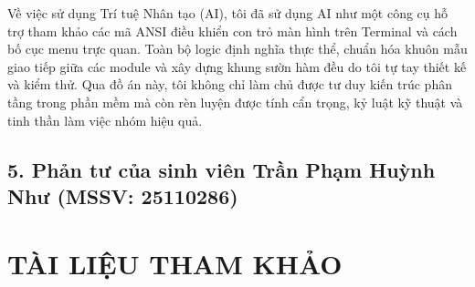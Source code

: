 \documentclass[14pt,a4paper]{extarticle}
\begin{document}
Về việc sử dụng Trí tuệ Nhân tạo (AI), tôi đã sử dụng AI như một công cụ hỗ trợ tham khảo các mã ANSI điều khiển con trỏ màn hình trên Terminal và cách bố cục menu trực quan. Toàn bộ logic định nghĩa thực thể, chuẩn hóa khuôn mẫu giao tiếp giữa các module và xây dựng khung sườn hàm đều do tôi tự tay thiết kế và kiểm thử. Qua đồ án này, tôi không chỉ làm chủ được tư duy kiến trúc phân tầng trong phần mềm mà còn rèn luyện được tính cẩn trọng, kỷ luật kỹ thuật và tinh thần làm việc nhóm hiệu quả.

\subsection*{5. Phản tư của sinh viên Trần Phạm Huỳnh Như (MSSV: 25110286)}

\vspace{2.5cm}

\newpage
\section*{TÀI LIỆU THAM KHẢO}
\end{document}
